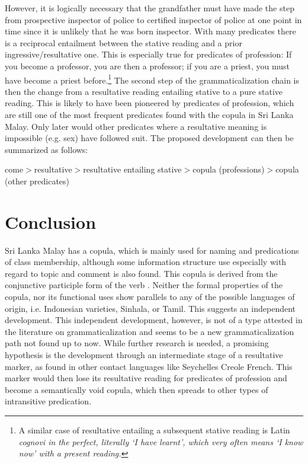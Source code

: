 \documentclass[a4paper,12pt]{article}
\begin{document}
However, it is logically necessary that the grandfather must have made the step from prospective inspector of police to certified inspector of police at one point in time since it is unlikely that he was born inspector. With many predicates there is a reciprocal entailment between the stative reading and a prior ingressive/resultative one. This is especially true for predicates of profession: If you become a professor, you are then a professor; if you are a priest, you must have become a priest before.\footnote{A similar case of resultative entailing a subsequent stative reading is Latin \em cognovi \em in the perfect, literally `I have learnt', which very often means `I know now' with a present reading.} The second step of the grammaticalization chain is then the change from a resultative reading entailing stative to a pure stative reading. This is likely to have been pioneered by predicates of profession, which are still one of the most frequent predicates found with the copula in Sri Lanka Malay. Only later would other predicates where a resultative meaning is impossible (e.g. sex) have followed suit. The proposed development can then be summarized as follows:

\small
\ea come$>$resultative$>$resultative entailing stative$>$copula (professions)$>$copula (other predicates)\z
\normalsize
 

\section{Conclusion}
Sri Lanka Malay has a copula, which is mainly used for naming and predications of class membership, although some information structure use especially with regard to topic and comment is also found. This copula is derived from the conjunctive participle form of the verb . Neither the formal properties of the copula, nor its functional uses show parallels to any of the possible languages of origin, i.e. Indonesian varieties, Sinhala, or Tamil. This suggests an independent development. This independent development, however, is not of a type attested in the literature on grammaticalization and seems to be a new grammaticalization path not found up to now. While further research is needed, a promising hypothesis is the development through an intermediate stage of a resultative marker, as found in other contact languages like Seychelles Creole French. This marker would then lose its resultative reading for predicates of profession and become a semantically void copula, which then spreads to other types of intransitive predication.





\end{document}
